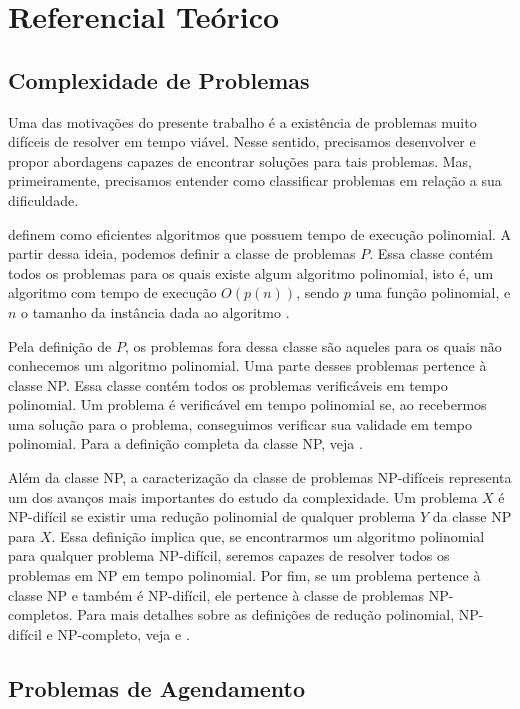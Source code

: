 \chapter{Referencial Teórico} \label{chapt:ref_teorico}

\section{Complexidade de Problemas}

Uma das motivações do presente trabalho é a existência de problemas muito difíceis de resolver em tempo viável. Nesse sentido, precisamos desenvolver e propor abordagens capazes de encontrar soluções para tais problemas. Mas, primeiramente, precisamos entender como classificar problemas em relação a sua dificuldade.

\cite{eva2005} definem como eficientes algoritmos que possuem tempo de execução polinomial. A partir dessa ideia, podemos definir a classe de problemas $P$. Essa classe contém todos os problemas para os quais existe algum algoritmo polinomial, isto é, um algoritmo com tempo de execução $O(p(n))$, sendo $p$ uma função polinomial, e $n$ o tamanho da instância dada ao algoritmo \citep{sipser2013introduction}.
 
Pela definição de $P$, os problemas fora dessa classe são aqueles para os quais não conhecemos um algoritmo polinomial. Uma parte desses problemas pertence à classe NP. Essa classe contém todos os problemas verificáveis em tempo polinomial. Um problema é verificável em tempo polinomial se, ao recebermos uma solução para o problema, conseguimos verificar sua validade em tempo polinomial. Para a definição completa da classe NP, veja \cite{eva2005}.

Além da classe NP, a caracterização da classe de problemas NP-difíceis representa um dos avanços mais importantes do estudo da complexidade. Um problema $X$ é NP-difícil se existir uma redução polinomial de qualquer problema $Y$ da classe NP para $X$. Essa definição implica que, se encontrarmos um algoritmo polinomial para qualquer problema NP-difícil, seremos capazes de resolver todos os problemas em NP em tempo polinomial. Por fim, se um problema pertence à classe NP e também é NP-difícil, ele pertence à classe de problemas NP-completos. Para mais detalhes sobre as definições de redução polinomial, NP-difícil e NP-completo, veja \cite{eva2005} e \cite{garey1990computers}.

\section{Problemas de Agendamento}

